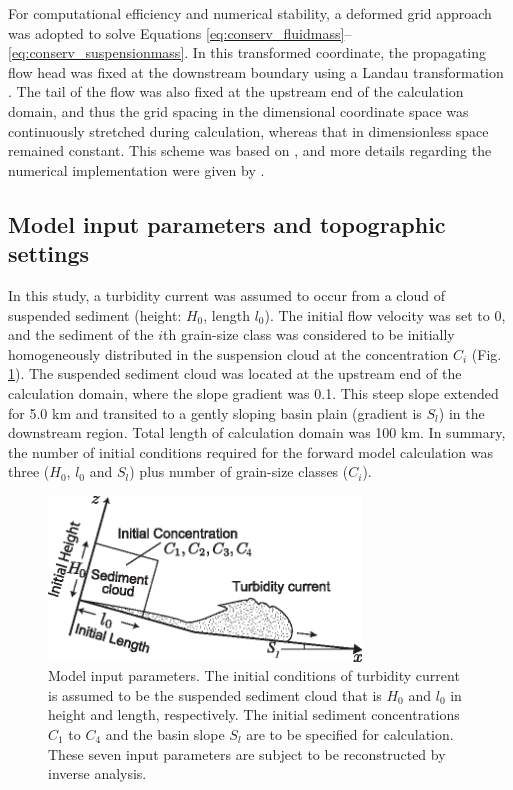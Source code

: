 For computational efficiency and numerical stability, a deformed grid approach was adopted to solve Equations \ref{eq:conserv_fluidmass}--\ref{eq:conserv_suspensionmass}. In this transformed coordinate, the propagating flow head was fixed at the downstream boundary using a Landau transformation \citep{Crank1984}. The tail of the flow was also fixed at the upstream end of the calculation domain, and thus the grid spacing in the dimensional coordinate space was continuously stretched during calculation, whereas that in dimensionless space remained constant. This scheme was based on \citet{kostic2006response}, and more details regarding the numerical implementation were given by \citet{Nakao2017}.

\subsection{Model input parameters and topographic settings}
In this study, a turbidity current was assumed to occur from a cloud of suspended sediment (height: $H_0$, length $l_0$). The initial flow velocity was set to 0, and the sediment of the $i$th grain-size class was considered to be initially homogeneously distributed in the suspension cloud at the concentration $C_i$ (Fig. \ref{fig:model_input_parameters}). The suspended sediment cloud was located at the upstream end of the calculation domain, where the slope gradient was 0.1. This steep slope extended for 5.0 km and transited to a gently sloping basin plain (gradient is $S_l$) in the downstream region. Total length of calculation domain was 100 km. In summary, the number of initial conditions required for the forward model calculation was three ($H_0$, $l_0$ and $S_l$) plus number of grain-size classes ($C_i$). 

\begin{figure}[t]
  \includegraphics[width=8.3cm]{fig03.eps}
  \caption{Model input parameters. The initial conditions of turbidity current is assumed to be the suspended sediment cloud that is $H_0$ and $l_0$ in height and length, respectively. The initial sediment concentrations $C_1$ to $C_4$ and the basin slope $S_l$ are to be specified for calculation. These seven input parameters are subject to be reconstructed by inverse analysis.}
  \label{fig:model_input_parameters}
\end{figure}
